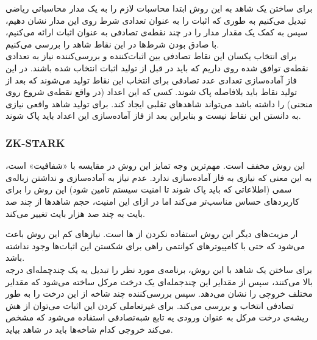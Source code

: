 برای ساختن یک شاهد به این روش ابتدا محاسبات لازم را به یک مدار محاسباتی ریاضی تبدیل می‌کنیم به طوری که اثبات را به عنوان تعدادی شرط روی این مدار نشان دهیم، سپس به کمک یک
مقدار مدار را در چند نقطه‌ی تصادفی به عنوان اثبات ارائه می‌کنیم، با صادق بودن شرط‌ها در این نقاط شاهد را بررسی می‌کنیم. 
\\
برای انتخاب یکسان این نقاط تصادفی بین اثبات‌کننده و بررسی‌کننده نیاز به تعدادی نقطه‌ی توافق شده روی  داریم که باید در قبل از تولید اثبات انتخاب شده باشند. در این فاز آماده‌سازی تعدادی عدد تصادفی برای انتخاب این نقاط تولید می‌شوند که بعد از تولید نقاط باید بلافاصله پاک شوند. کسی که این اعداد (در واقع نقطه‌ی شروع روی منحنی) را داشته باشد می‌تواند شاهد‌های تقلبی ایجاد کند. برای تولید شاهد واقعی نیازی به دانستن این نقاط نیست و بنابراین بعد از فاز آماده‌سازی این اعداد باید پاک شوند. 
\subsubsection{ZK-STARK}
این روش مخفف
است. مهم‌ترین وجه تمایز این روش در مقایسه با
 «شفافیت»
است، به این معنی که نیازی به فاز آماده‌سازی ندارد. عدم نیاز به آماده‌سازی و نداشتن زباله‌ی سمی (اطلاعاتی که باید پاک شوند تا امنیت سیستم تامین شود) این روش را برای کاربرد‌های حساس مناسب‌تر می‌کند اما در ازای این امنیت، حجم شاهد‌ها از چند صد بایت به چند صد هزار بایت تغییر می‌کند.
\par
ار مزیت‌های دیگر این روش استفاده نکردن از 
ها
است. نیاز‌های کم این روش باعث می‌شود که حتی با کامپیوتر‌های کوانتمی
 راهی برای شکستن این اثبات‌ها وجود نداشته باشد.
\\
برای ساختن یک شاهد با این روش، برنامه‌ی مورد نظر را تبدیل یه یک چندچمله‌ای درجه بالا می‌کنند، سپس از مقدایر این چندجمله‌ای یک درخت مرکل ساخته می‌شود که مقدایر مختلف خروچی را نشان می‌دهد. سپس بررسی‌کننده چند شاخه از این درخت را به طور تصادفی انتخاب و بررسی می‌کند. برای غیرتعاملی کردن این اثبات می‌توان از هش ریشه‌ی درخت مرکل به عنوان ورودی یه تابع شبه‌تصادفی
استفاده می‌شود که مشخص می‌کند خروجی کدام شاخه‌ها باید در شاهد بیاید. 






